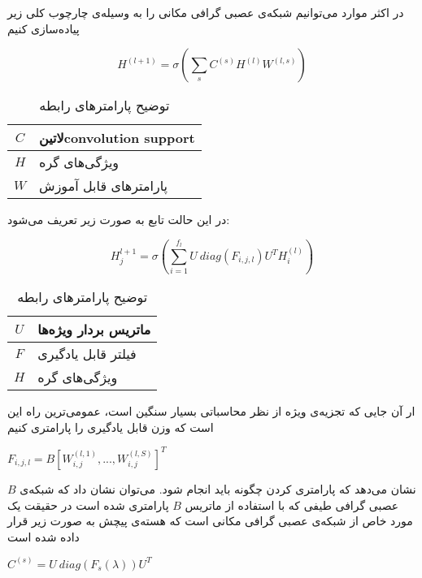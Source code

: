 در اکثر موارد می‌توانیم شبکه‌ی عصبی گرافی مکانی را به وسیله‌ی چارچوب کلی زیر پیاده‌سازی کنیم

\begin{equation}
  \label{eq:spatial_1}
H^{(l+1)}=\sigma(\sum_{s}C^{(s)}H^{(l)}W^{(l,s)})
\end{equation}

\begin{table}[h]
  \centering
  \caption{توضیح پارامترهای رابطه }
  \begin{tabular}{|c|p{}|}
    \hline
    $C$ & ‌لاتین{convolution support} \\
    \hline
    $H$ & ویژگی‌های گره \\
    \hline
    $W$ & پارامترهای قابل آموزش \\
    \hline
  \end{tabular}
  \label{tbl:distance}
\end{table}


در این حالت تابع به صورت زیر تعریف می‌شود:

\begin{equation}
  \label{eq:spectral}
H_j^{l+1}=\sigma(\sum_{i=1}^{f_l}U\:diag(F_{i,j,l})U^TH_i^{(l)})
\end{equation}

\begin{table}[h]
  \centering
  \caption{توضیح پارامترهای رابطه }
  \begin{tabular}{|c|p{}|}
    \hline
    $U$ & ماتریس بردار ویژه‌ها \\
    \hline
    $F$ & فیلتر قابل یادگیری \\
    \hline
    $H$ & ویژگی‌های گره \\
    \hline
  \end{tabular}
  \label{tbl:distance}
\end{table}

ار آن جایی که تجزیه‌ی ویژه از نظر محاسباتی بسیار سنگین است، عمومی‌ترین راه این است که وزن قابل یادگیری را پارامتری کنیم

$F_{i,j,l}=B[W_{i,j}^{(l,1)},...,W_{i,j}^{(l,S)}]^T$

$B$ نشان می‌دهد که پارامتری کردن چگونه باید انجام شود. می‌توان نشان داد که شبکه‌ی عصبی گرافی طیفی که با استفاده از ماتریس $B$ پارامتری شده است در حقیقت یک مورد خاص از شبکه‌ی عصبی گرافی مکانی است که هسته‌ی پیچش به صورت زیر قرار داده شده است

$C^{(s)}=U\:diag(F_s(\lambda))U^T$


